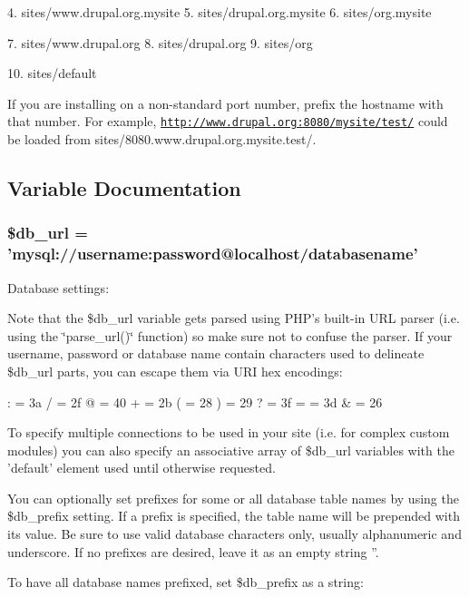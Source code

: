 4. sites/www.drupal.org.mysite 5. sites/drupal.org.mysite 6. sites/org.mysite

7. sites/www.drupal.org 8. sites/drupal.org 9. sites/org

10. sites/default

If you are installing on a non-standard port number, prefix the hostname with that number. For example, \href{http://www.drupal.org:8080/mysite/test/}{\tt http://www.drupal.org:8080/mysite/test/} could be loaded from sites/8080.www.drupal.org.mysite.test/. 

\subsection{Variable Documentation}
\hypertarget{default_8settings_8php_01f60cfc6d59f1f30585ac6b516d739b}{
\subsubsection[{\$db\_\-url}]{\setlength{\rightskip}{0pt plus 5cm}\$db\_\-url = 'mysql://username:password@localhost/databasename'}}
\label{default_8settings_8php_01f60cfc6d59f1f30585ac6b516d739b}


Database settings:

Note that the \$db\_\-url variable gets parsed using PHP's built-in URL parser (i.e. using the \char`\"{}parse\_\-url()\char`\"{} function) so make sure not to confuse the parser. If your username, password or database name contain characters used to delineate \$db\_\-url parts, you can escape them via URI hex encodings:

: = 3a / = 2f @ = 40 + = 2b ( = 28 ) = 29 ? = 3f = = 3d \& = 26

To specify multiple connections to be used in your site (i.e. for complex custom modules) you can also specify an associative array of \$db\_\-url variables with the 'default' element used until otherwise requested.

You can optionally set prefixes for some or all database table names by using the \$db\_\-prefix setting. If a prefix is specified, the table name will be prepended with its value. Be sure to use valid database characters only, usually alphanumeric and underscore. If no prefixes are desired, leave it as an empty string ''.

To have all database names prefixed, set \$db\_\-prefix as a string:

